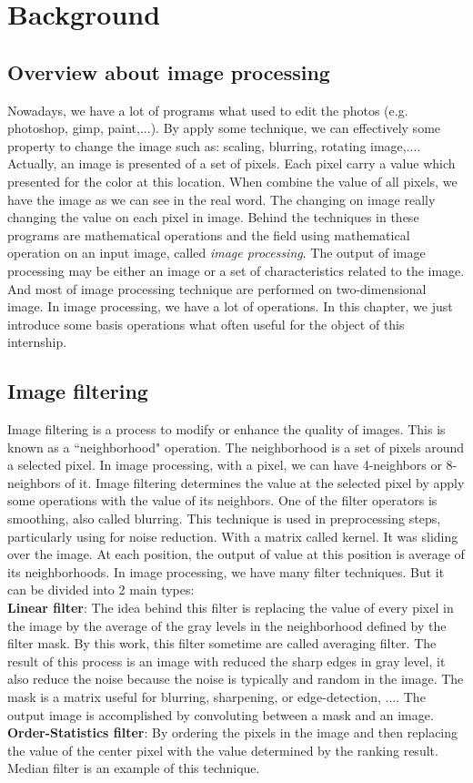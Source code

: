 \chapter{Background}\section{Overview about image processing}
Nowadays, we have a lot of programs what used to edit the photos (e.g. photoshop, gimp, paint,...). By apply some technique, we can effectively some property to change the image such as: scaling, blurring, rotating image,.... Actually, an image is presented of a set of pixels. Each pixel carry a value which presented for the color at this location. When combine the value of all pixels, we have the image as we can see in the real word. The changing on image really changing the value on each pixel in image. Behind the techniques in these programs are mathematical operations and the field using mathematical operation on an input image,  called \textit{image processing}. The output of image processing may be either an image or a set of characteristics related to the image. And most of image processing technique are performed on two-dimensional image. In image processing, we have a lot of operations. In this chapter, we just introduce some basis operations what often useful for the object of this internship.
\section{Image filtering}
Image filtering is a process to modify or enhance the quality of images. This is known as a ``neighborhood" operation. The neighborhood is a set of pixels around a selected pixel. In image processing, with a pixel, we can have 4-neighbors or 8-neighbors of it. Image filtering determines the value at the selected pixel by apply some operations with the value of its neighbors. One of the filter operators is smoothing, also called blurring. This technique is used in preprocessing steps, particularly using for noise reduction. With a matrix called kernel. It was sliding over the image. At each position, the output of value at this position is average of its neighborhoods.
In image processing, we have many filter techniques. But it can be divided into 2 main types:\\[0.2cm]
\textbf{Linear filter}: The idea behind this filter is replacing the value of every pixel in the image by the average of the gray levels in the neighborhood defined by the filter mask. By this work, this filter sometime are called averaging filter. The result of this process is an image with reduced the sharp edges in gray level, it also reduce the noise because the noise is typically and random in the image. The mask is a matrix useful for blurring, sharpening, or edge-detection, .... The output image is accomplished by convoluting between a mask and an image.\\[0.2cm]
\textbf{Order-Statistics filter}: By ordering the pixels in the image and then replacing the value of the center pixel with the value determined by the ranking result. Median filter is an example of this technique.
